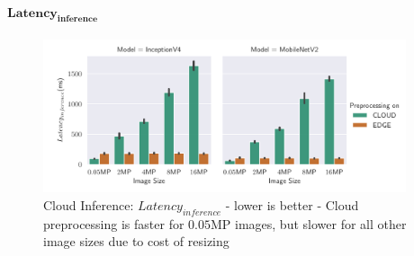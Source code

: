 \paragraph{$\mathbf{Latency_{inference}}$}
\begin{figure}[!htb]
\centering
\includegraphics[width=0.95\textwidth]{./Bilder/single_plots/cloud_inference_plots/Cloud_Inference_Latency.pdf}
\caption[Cloud Inference:  $Latency_{inference}$ - lower is better]{Cloud Inference:  $Latency_{inference}$ - lower is better - Cloud preprocessing is faster for $0.05$MP images, but slower for all other image sizes due to cost of resizing}
\label{fig:cloudInferenceInferenceLatency}
\end{figure}
